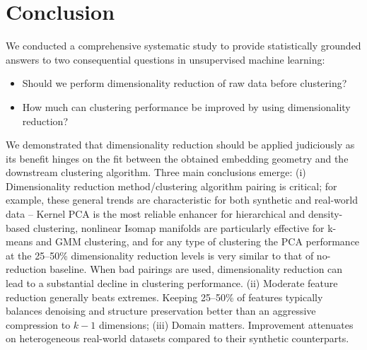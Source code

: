 \documentclass[preprint,12pt]{elsarticle}
\begin{document}

\section{Conclusion}\label{sec:conclusion}
We conducted a comprehensive systematic study to provide statistically grounded answers to two consequential questions in unsupervised machine learning: 
\begin{itemize}
    \item Should we perform dimensionality reduction of raw data before clustering?
    \item How much can clustering performance be improved by using dimensionality reduction?
\end{itemize} 

We demonstrated that dimensionality reduction should be applied judiciously as its benefit hinges on the fit between the obtained embedding geometry and the downstream clustering algorithm. Three main conclusions emerge: (i) Dimensionality reduction method/clustering algorithm pairing is critical; for example, these general trends are characteristic for both synthetic and real-world data – Kernel PCA is the most reliable enhancer for hierarchical and density-based clustering, %
nonlinear Isomap manifolds are particularly effective for k-means and GMM clustering, and for any type of clustering the PCA performance at the 25–50\% dimensionality reduction levels is very similar to that of no-reduction baseline. When bad pairings are used, dimensionality reduction can lead to a substantial decline in clustering performance.
(ii) Moderate feature reduction generally beats extremes. Keeping 25–50\% of features typically balances denoising and structure preservation better than an aggressive compression to $k-1$ dimensions; (iii) Domain matters. Improvement attenuates on heterogeneous real-world datasets compared to their synthetic counterparts. %
\end{document}
